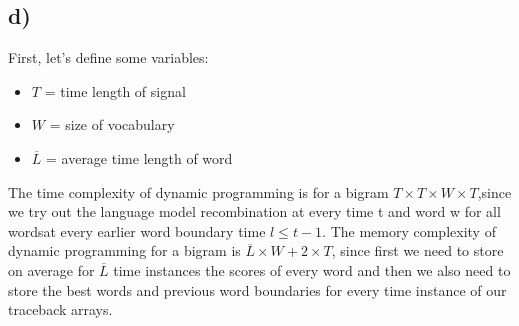 \subsection*{d)}%
\label{sub:d_}

First, let's define some variables: 
\begin{itemize}
	\item $T$ = time length of signal
	\item $W$ = size of vocabulary
	\item $\overline{L}$ = average time length of word
\end{itemize}

The time complexity of dynamic programming is for a bigram $T \times T \times W \times T$,since we try out the language model recombination at every time t and word w for all wordsat every earlier word boundary time $l \le t - 1$.
The memory complexity of dynamic programming for a bigram is $\overline{L} \times W + 2 \times T$, since first we need to store on average for $\overline{L}$ time instances the 
scores of every word and then we also need to store the best words and previous word boundaries for every time instance of our traceback arrays.

